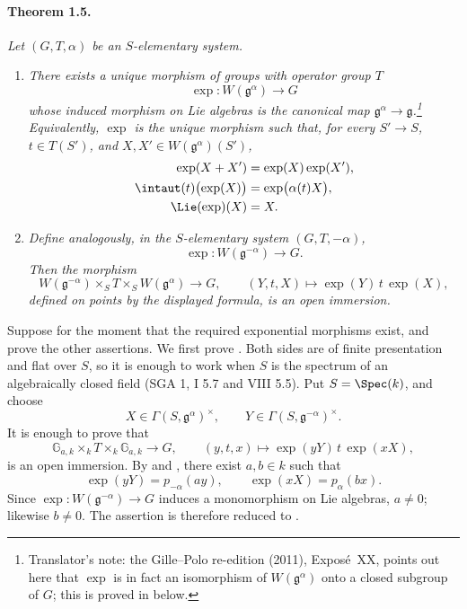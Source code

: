 
\paragraph{\textbf{Theorem 1.5.}}
\emph{Let \((G,T,\alpha)\) be an \(S\)-elementary system.}
\begin{enumerate}
\item[\textup{\SGAInlineRefTarget{sga3:xx:1.5:item:i}(i)}] \emph{There exists a unique morphism of groups
  with operator group \(T\)
  \[
    \exp\colon W(\mathfrak g^\alpha)\longrightarrow G
  \]
  whose induced morphism on Lie algebras is the canonical map
  \(\mathfrak g^\alpha\to\mathfrak g\).\footnote{Translator's note: the Gille--Polo re-edition (2011), Exposé~XX, points out here that \(\exp\) is in
  fact an isomorphism of \(W(\mathfrak g^\alpha)\) onto a closed subgroup of \(G\); this is
  proved in  below.}
  Equivalently, \(\exp\) is the unique morphism such that, for every
  \(S'\to S\), \(t\in T(S')\), and
  \(X,X'\in W(\mathfrak g^\alpha)(S')\),
  \[
  \begin{aligned}
    \exp(X+X')&=\exp(X)\exp(X'),\\
    \intaut(t)\bigl(\exp(X)\bigr)&=\exp\bigl(\alpha(t)X\bigr),\\
    \Lie(\exp)(X)&=X.
  \end{aligned}
  \]}
\item[\textup{\SGAInlineRefTarget{sga3:xx:1.5:item:ii}(ii)}] \emph{Define analogously, in the
  \(S\)-elementary system \((G,T,-\alpha)\),
  \[
    \exp\colon W(\mathfrak g^{-\alpha})\longrightarrow G.
  \]
  Then the morphism
  \[
    W(\mathfrak g^{-\alpha})\times_S T
      \times_S W(\mathfrak g^\alpha)\longrightarrow G,
    \qquad
    (Y,t,X)\longmapsto \exp(Y)\,t\,\exp(X),
  \]
  defined on points by the displayed formula, is an open
  immersion.}
\end{enumerate}

Suppose for the moment that the required exponential morphisms
exist, and prove the other assertions. We first prove \textup{}.
Both sides are of finite presentation and flat over \(S\), so it is
enough to work when \(S\) is the spectrum of an algebraically closed
field \textup{(SGA 1, I 5.7 and VIII 5.5)}. Put \(S=\Spec(k)\), and
choose
\[
  X\in\Gamma(S,\mathfrak g^\alpha)^\times,
  \qquad
  Y\in\Gamma(S,\mathfrak g^{-\alpha})^\times.
\]
It is enough to prove that
\[
  \mathbb G_{a,k}\times_k T\times_k\mathbb G_{a,k}
    \longrightarrow G,
  \qquad
  (y,t,x)\longmapsto \exp(yY)\,t\,\exp(xX),
\]
is an open immersion. By  and , there exist \(a,b\in k\)
such that
\[
  \exp(yY)=p_{-\alpha}(ay),
  \qquad
  \exp(xX)=p_\alpha(bx).
\]
Since
\(\exp\colon W(\mathfrak g^{-\alpha})\to G\) induces a monomorphism
on Lie algebras, \(a\neq0\); likewise \(b\neq0\). The assertion is
therefore reduced to .

